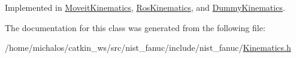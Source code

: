 Implemented in \hyperlink{classMoveitKinematics_aee274ed4deddecb36191f8711c4b7c2e}{Moveit\-Kinematics}, \hyperlink{classRosKinematics_af9af8957f54e5d2343b2ab00dcb55525}{Ros\-Kinematics}, and \hyperlink{classDummyKinematics_a0b5a581fb840f304cebc80fb00eb7138}{Dummy\-Kinematics}.



The documentation for this class was generated from the following file\-:\begin{DoxyCompactItemize}
\item 
/home/michalos/catkin\-\_\-ws/src/nist\-\_\-fanuc/include/nist\-\_\-fanuc/\hyperlink{Kinematics_8h}{Kinematics.\-h}\end{DoxyCompactItemize}
